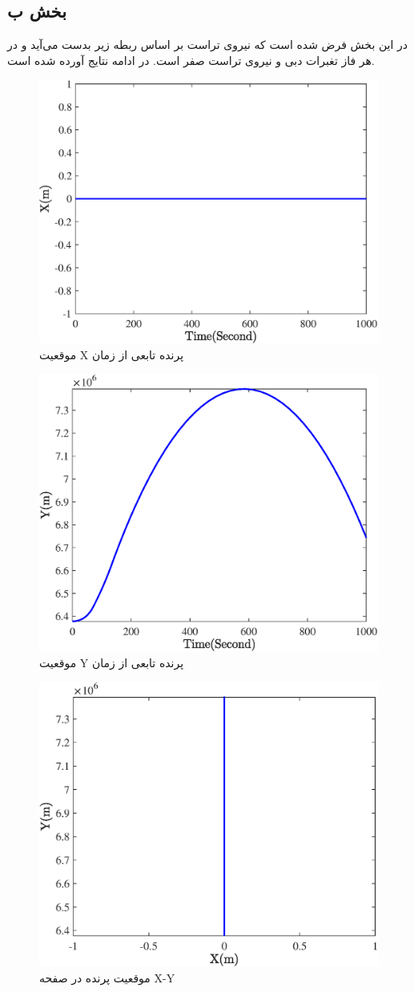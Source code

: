 \subsection{بخش ب}
در این بخش فرض شده است که نیروی تراست بر اساس ربطه زیر بدست می‌آید و در هر فاز تغبرات دبی و نیروی تراست صفر است.
در ادامه نتایج آورده شده است.
\begin{figure}[H]
	\centering
	\includegraphics[width=.75\linewidth]{../Figure/Q1/b/x}
	\caption{موقعیت X پرنده تابعی از زمان}
\end{figure}
\begin{figure}[H]
	\centering
	\includegraphics[width=.75\linewidth]{../Figure/Q1/b/y}
	\caption{موقعیت Y پرنده تابعی از زمان}
\end{figure}

\begin{figure}[H]
	\centering
	\includegraphics[width=.75\linewidth]{../Figure/Q1/b/xy}
	\caption{موقعیت پرنده در صفحه X-Y  }
\end{figure}


